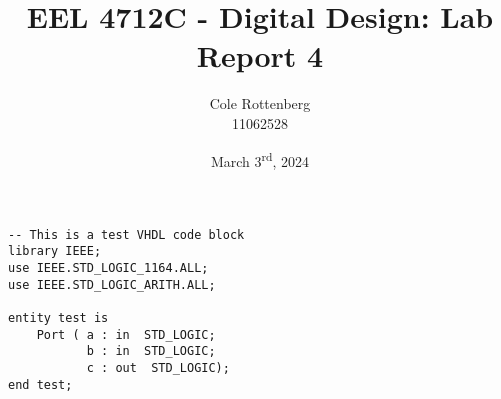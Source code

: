 \documentclass{article}
\title{EEL 4712C - Digital Design: Lab Report 4}
\author{Cole Rottenberg \\ 11062528}
\date{March 3\textsuperscript{rd}, 2024}
\begin{document}
\maketitle

\begin{lstlisting}[caption=Test VHDL Code, label=lst:test-vhdl-code]
-- This is a test VHDL code block
library IEEE;
use IEEE.STD_LOGIC_1164.ALL;
use IEEE.STD_LOGIC_ARITH.ALL;

entity test is
    Port ( a : in  STD_LOGIC;
           b : in  STD_LOGIC;
           c : out  STD_LOGIC);
end test;
\end{lstlisting}





\end{document}
